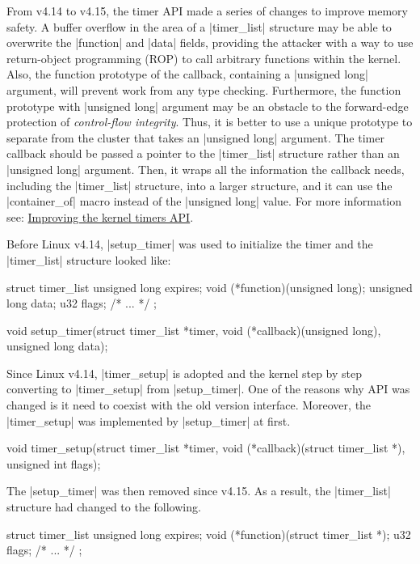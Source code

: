 \documentclass[10pt, oneside]{book}
\begin{document}
From v4.14 to v4.15, the timer API made a series of changes to improve memory safety.
A buffer overflow in the area of a \cpp|timer_list| structure may be able to overwrite the \cpp|function| and \cpp|data| fields, providing the attacker with a way to use return-object programming (ROP) to call arbitrary functions within the kernel.
Also, the function prototype of the callback, containing a \cpp|unsigned long| argument, will prevent work from any type checking.
Furthermore, the function prototype with \cpp|unsigned long| argument may be an obstacle to the forward-edge protection of \textit{control-flow integrity}.
Thus, it is better to use a unique prototype to separate from the cluster that takes an \cpp|unsigned long| argument.
The timer callback should be passed a pointer to the \cpp|timer_list| structure rather than an \cpp|unsigned long| argument.
Then, it wraps all the information the callback needs, including the \cpp|timer_list| structure, into a larger structure, and it can use the \cpp|container_of| macro instead of the \cpp|unsigned long| value.
For more information see: \href{https://lwn.net/Articles/735887/}{Improving the kernel timers API}.

Before Linux v4.14, \cpp|setup_timer| was used to initialize the timer and the \cpp|timer_list| structure looked like:
\begin{code}
struct timer_list {
    unsigned long expires;
    void (*function)(unsigned long);
    unsigned long data;
    u32 flags;
    /* ... */
};

void setup_timer(struct timer_list *timer, void (*callback)(unsigned long),
                 unsigned long data);
\end{code}

Since Linux v4.14, \cpp|timer_setup| is adopted and the kernel step by step converting to \cpp|timer_setup| from \cpp|setup_timer|.
One of the reasons why API was changed is it need to coexist with the old version interface.
Moreover, the \cpp|timer_setup| was implemented by \cpp|setup_timer| at first.
\begin{code}
void timer_setup(struct timer_list *timer,
                 void (*callback)(struct timer_list *), unsigned int flags);
\end{code}

The \cpp|setup_timer| was then removed since v4.15.
As a result, the \cpp|timer_list| structure had changed to the following.
\begin{code}
struct timer_list {
    unsigned long expires;
    void (*function)(struct timer_list *);
    u32 flags;
    /* ... */
};
\end{code}
\end{document}
